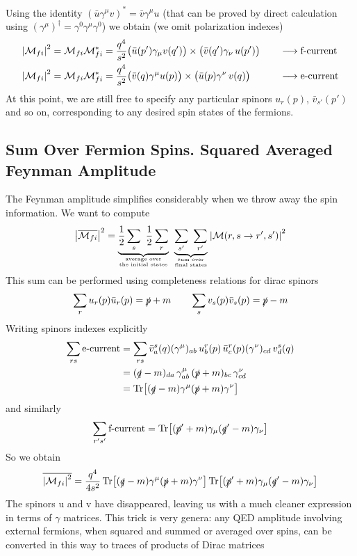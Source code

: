 \documentclass[TheoreticalPhy_ModB.tex]{subfiles}
\begin{document}
Using the identity $(\bar{u} \gamma^{\mu} v)^* = \bar{v} \gamma^{\mu} u$ (that can be proved by direct calculation using
$(\gamma^{\mu})^{\dagger} = \gamma^0 \gamma^{\mu} \gamma^0$) we obtain (we omit polarization indexes)
\begin{alignat*}{2}
\abs{\mathcal{M}_{fi}}^2 = \mathcal{M}_{fi} \mathcal{M}^*_{fi}
	& = \frac{q^4}{s^2} \bigl( \bar{u}(p')\gamma_{\mu} v(q') \bigr) \times \bigl( \bar{v}(q') \gamma_{\nu} \, u(p') \bigr) 
		 & \quad	& \longrightarrow \textup{f-current} \\	
\abs{\mathcal{M}_{fi}}^2 = \mathcal{M}_{fi} \mathcal{M}^*_{fi}
	& = \frac{q^4}{s^2} \bigl( \bar{v}(q) \gamma^{\mu}u(p) \bigr) \times \bigl(\bar{u}(p)\gamma^{\nu} \, v(q) \bigr)
		&		& \longrightarrow \textup{e-current}										
\end{alignat*}
At this point, we are still free to specify any particular spinors $u_r(p)$, $\bar{v}_{s'}(p')$ and so on, corresponding to any desired spin states of the fermions.

\subsection{Sum Over Fermion Spins. Squared Averaged Feynman Amplitude}
The Feynman amplitude simplifies considerably when we throw away the spin information. We want to compute
\[
\abs{\overline{\mathM_{fi}}}^2 = \underbrace{\frac{1}{2} \sum_s \ \frac{1}{2} \sum_r}_{\textup{average over} \atop \text{the initial states}} \ 
	\underbrace{\sum_{s'} \ \sum_{r'}}_{\textup{sum over} \atop \text{final states}} \abs{\mathM(r,s \to r',s')}^2
\]
This sum can be performed using completeness relations for dirac spinors
\[
\sum_r u_r(p) \bar{u}_r(p) = \slashed p + m
\qquad
\sum_s v_s(p) \bar{v}_s(p) = \slashed p - m
\]
Writing spinors indexes explicitly 
\[
\begin{split}
\sum_{rs} \text{e-current}	& = \sum_{rs} \bar{v}^s_a(q) (\gamma^{\mu})_{ab} \, u^r_b(p) \, \bar{u}^r_c(p) (\gamma^{\nu})_{cd} \, v_d^s(q) \\
					& = (\slashed q - m)_{da} \, \gamma^{\mu}_{ab} \, (\slashed p + m)_{bc} \, \gamma_{cd}^{\nu} \\
					& = \Tr \bigl[ (\slashed q - m) \gamma^{\mu} (\slashed p + m) \gamma^{\nu} \bigr]
\end{split}
\]
and similarly
\[
\sum_{r's'} \text{f-current} = \Tr \bigl[ (\slashed p' + m) \gamma_{\mu} (\slashed q' - m)\gamma_{\nu} \bigr]
\]
So we obtain
\[
\overline{\abs{\mathcal{M}_{fi}}^2} = \frac{q^4}{4s^2} \Tr \bigl[ (\slashed q - m) \gamma^{\mu} (\slashed p + m) \gamma^{\nu} \bigr]
	\Tr \bigl[ (\slashed p' + m) \gamma_{\mu} (\slashed q' -m) \gamma_{\nu} \bigr]
\]
The spinors u and v have disappeared, leaving us with a much cleaner expression in terms of $\gamma$ matrices. This trick is very genera: any QED amplitude involving external fermions, when squared and summed or averaged over spins, can be converted in this way to traces of products of Dirac matrices
\end{document}
